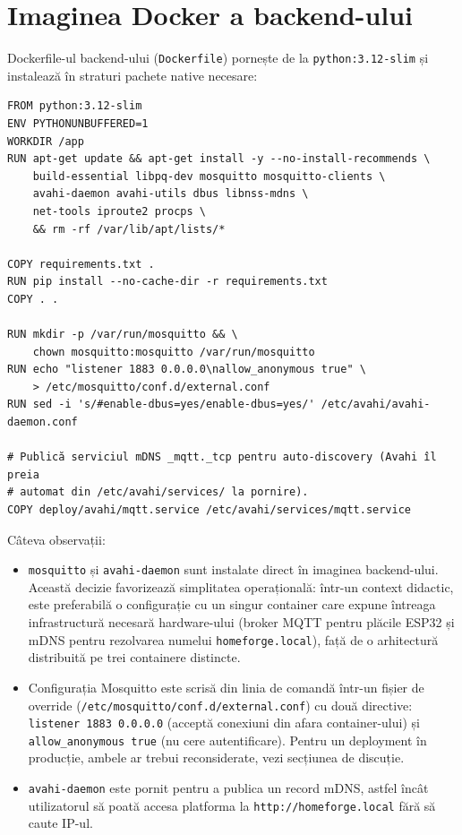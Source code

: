\section{Imaginea Docker a backend-ului}
Dockerfile-ul backend-ului (\texttt{Dockerfile}) pornește de la \texttt{python:3.12-slim} și instalează în straturi pachete native necesare:
\begin{verbatim}
FROM python:3.12-slim
ENV PYTHONUNBUFFERED=1
WORKDIR /app
RUN apt-get update && apt-get install -y --no-install-recommends \
    build-essential libpq-dev mosquitto mosquitto-clients \
    avahi-daemon avahi-utils dbus libnss-mdns \
    net-tools iproute2 procps \
    && rm -rf /var/lib/apt/lists/*

COPY requirements.txt .
RUN pip install --no-cache-dir -r requirements.txt
COPY . .

RUN mkdir -p /var/run/mosquitto && \
    chown mosquitto:mosquitto /var/run/mosquitto
RUN echo "listener 1883 0.0.0.0\nallow_anonymous true" \
    > /etc/mosquitto/conf.d/external.conf
RUN sed -i 's/#enable-dbus=yes/enable-dbus=yes/' /etc/avahi/avahi-daemon.conf

# Publică serviciul mDNS _mqtt._tcp pentru auto-discovery (Avahi îl preia
# automat din /etc/avahi/services/ la pornire).
COPY deploy/avahi/mqtt.service /etc/avahi/services/mqtt.service
\end{verbatim}

Câteva observații:
\begin{itemize}
    \item \texttt{mosquitto} și \texttt{avahi-daemon} sunt instalate direct în imaginea backend-ului. Această decizie favorizează simplitatea operațională: într-un context didactic, este preferabilă o configurație cu un singur container care expune întreaga infrastructură necesară hardware-ului (broker MQTT pentru plăcile ESP32 și mDNS pentru rezolvarea numelui \texttt{homeforge.local}), față de o arhitectură distribuită pe trei containere distincte.
    \item Configurația Mosquitto este scrisă din linia de comandă într-un fișier de override (\texttt{/etc/mosquitto/conf.d/external.conf}) cu două directive: \texttt{listener 1883 0.0.0.0} (acceptă conexiuni din afara container-ului) și \texttt{allow\_anonymous true} (nu cere autentificare). Pentru un deployment în producție, ambele ar trebui reconsiderate, vezi secțiunea de discuție.
    \item \texttt{avahi-daemon} este pornit pentru a publica un record mDNS, astfel încât utilizatorul să poată accesa platforma la \texttt{http://homeforge.local} fără să caute IP-ul.
\end{itemize}

